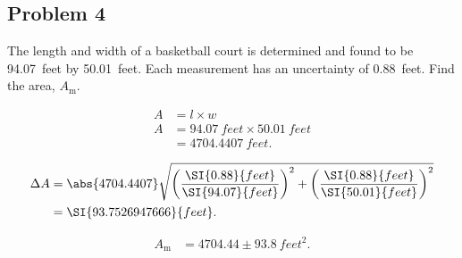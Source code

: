 
\subsection{Problem 4}

The length and width of a basketball court is determined and found to be \SI{94.07}{feet} by \SI{50.01}{feet}. Each measurement has an uncertainty of \SI{0.88}{feet}. Find the area, $A_{\mathrm{m}}$.

\begin{align*}
	A &= l \times w \\
	A &= \SI{94.07}{feet} \times \SI{50.01}{feet} \\
	&= \SI{4704.4407}{feet}
	.\end{align*}

\begin{align*}
	\Delta A &= \abs{ 4704.4407 } \sqrt{\left( \frac{\SI{0.88}{feet}}{\SI{94.07}{feet}} \right)^2 + \left( \frac{\SI{0.88}{feet}}{\SI{50.01}{feet}} \right)^2} \\
	&= \SI{93.7526947666}{feet}
	.\end{align*}

\begin{align*}
	A_{\mathrm{m}} &= 4704.44 \pm \SI{93.8}{feet^2}
	.\end{align*}
